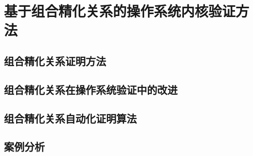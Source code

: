\chapter{基于组合精化关系的操作系统内核验证方法}
\label{ch3}
\vspace{-0.7cm}
\section{组合精化关系证明方法}
\section{组合精化关系在操作系统验证中的改进}
\section{组合精化关系自动化证明算法}
\section{案例分析}

